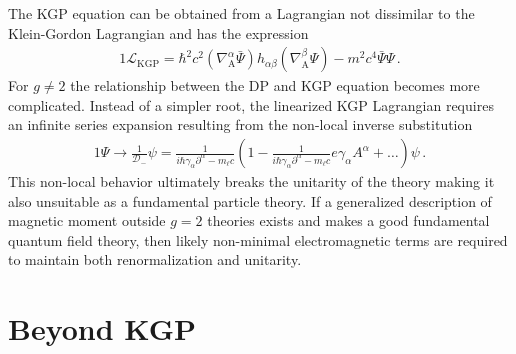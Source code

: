 The KGP equation can be obtained from a Lagrangian not dissimilar to the Klein-Gordon Lagrangian and has the expression
\begin{alignat}{1}
	\label{eq:problems02} \mathcal{L}_{\mathrm{KGP}}=\hbar^{2}c^{2}\left(\nabla^{\alpha}_{\mathrm{A}}\bar{\Psi}\right)h_{\alpha\beta}\left(\nabla^{\beta}_{\mathrm{A}}\Psi\right)-m^{2}c^{4}\bar{\Psi}\Psi\,.
\end{alignat}
For $g\neq2$ the relationship between the DP and KGP equation becomes more complicated. Instead of a simpler root, the linearized KGP Lagrangian requires an infinite series expansion \cite{Veltman:1997am} resulting from the non-local inverse substitution 
\begin{alignat}{1}
	\label{eq:kgp:04} \Psi\rightarrow\frac{1}{\mathcal{D}_{-}}\psi=\frac{1}{i\hbar\gamma_{\alpha}\partial^{\alpha}-m_{\ell}c}\left(1-\frac{1}{i\hbar\gamma_{\alpha}\partial^{\alpha}-m_{\ell}c}e\gamma_{\alpha}A^{\alpha}+\ldots\right)\psi\,.
\end{alignat}
This non-local behavior ultimately breaks the unitarity of the theory making it also unsuitable as a fundamental particle theory. If a generalized description of magnetic moment outside $g=2$ theories exists and makes a good fundamental quantum field theory, then likely non-minimal electromagnetic terms are required to maintain both renormalization and unitarity.



\section{Beyond KGP}
